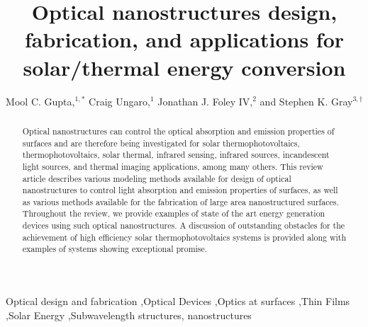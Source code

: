 \documentclass[review]{elsarticle}
\begin{document}
\begin{frontmatter}
\title{Optical nanostructures design, fabrication, and applications for solar/thermal energy conversion } %

\author{Mool C. Gupta,$^{1,*}$ Craig Ungaro,$^1$ 
Jonathan J. Foley IV,$^{2}$ and Stephen K. Gray$^{3,\dagger}$}

\address{$^1$Department of Electrical \& Computer Engineering, University of Virginia, Charlottesville, Virginia, 22901, USA \\
$^2$Department of Chemistry, William Paterson University, 300 Pompton Road, Wayne, NJ, 07470, USA \\
$^3$Center for Nanoscale Materials, Argonne National Laboratory, 9700 South Cass Avenue, Argonne, IL, 60439, USA \\
$^*$mgupta@virginia.edu \\
$^{\dagger}$gray@anl.gov}


\begin{abstract}
Optical nanostructures can control the optical absorption and emission properties of surfaces and are therefore being investigated for solar thermophotovoltaics, thermophotovoltaics, solar thermal, infrared sensing, infrared sources, incandescent light sources, and thermal imaging applications, among many others. This review article describes various modeling methods available for design of 
optical nanostructures to control light absorption and emission properties of surfaces, as well as various methods available for the fabrication of large area nanostructured surfaces. Throughout the review, we provide examples of state of the art energy generation devices using such 
optical nanostructures.  A discussion of outstanding obstacles for the achievement of high efficiency solar thermophotovoltaics systems is provided along with examples of systems showing exceptional promise. 
\end{abstract}

\begin{keyword}
Optical design and fabrication \sep Optical Devices \sep Optics at surfaces \sep Thin Films \sep Solar Energy \sep Subwavelength structures, nanostructures
\end{keyword}




\end{frontmatter}
\end{document}
